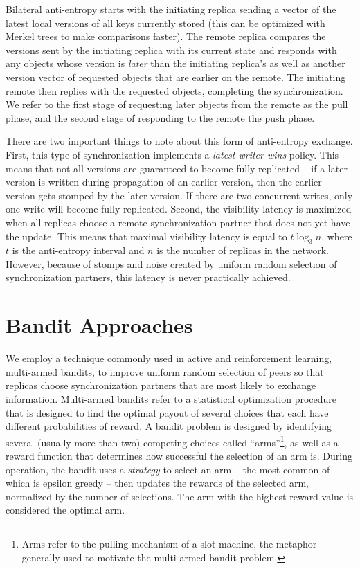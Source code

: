 Bilateral anti-entropy starts with the initiating replica sending a vector of
the latest local versions of all keys currently stored (this can be optimized
with Merkel trees to make comparisons faster).
The remote replica compares the versions sent by the initiating replica with
its current state and responds with any objects whose version is
\textit{later} than the initiating replica's as well as another version
vector of requested objects that are earlier on the remote.
The initiating remote then replies with the requested objects, completing the
synchronization.
We refer to the first stage of requesting later objects from the remote as
the pull phase, and the second stage of responding to the remote the push
phase.

There are two important things to note about this form of anti-entropy
exchange.
First, this type of synchronization implements a \textit{latest writer wins}
policy.
This means that not all versions are guaranteed to become fully replicated
-- if a later version is written during propagation of an earlier version,
then the earlier version gets stomped by the later version.
If there are two concurrent writes, only one write will become fully
replicated.
Second, the visibility latency is maximized when all replicas choose a remote
synchronization partner that does not yet have the update.
This means that maximal visibility latency is equal to $t\log_3n$, where
$t$ is the anti-entropy interval and $n$ is the number of replicas in the
network.
However, because of stomps and noise created by uniform random selection of
synchronization partners, this latency is never practically achieved.

\section*{Bandit Approaches}

We employ a technique commonly used in active and reinforcement learning,
multi-armed bandits, to improve uniform random selection of peers so that
replicas choose synchronization partners that are most likely to exchange
information.
Multi-armed bandits refer to a statistical optimization procedure that is
designed to find the optimal payout of several choices that each have
different probabilities of reward.
A bandit problem is designed by identifying several (usually more than two)
competing choices called ``arms''\footnote{Arms refer to the pulling
mechanism of a slot machine, the metaphor generally used to motivate the
multi-armed bandit problem.}, as well as a reward function that determines how
successful the selection of an arm is.
During operation, the bandit uses a \textit{strategy} to select an arm -- the
most common of which is epsilon greedy -- then updates the rewards of the
selected arm, normalized by the number of selections.
The arm with the highest reward value is considered the optimal arm.

